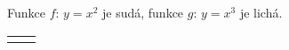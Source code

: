 \wikitextrule
\begin{example}\label{MAI:exam024} 
  Funkce $f:\,y=x^2$ je sudá, funkce $g:\,y=x^3$ je lichá.
  
  {\centering
   \begin{tabular}{cc}
                   &
                  \\
  \end{tabular}
  \captionsetup{type=figure}
  \label{MAI:fig_002}
  \par}
\end{example}